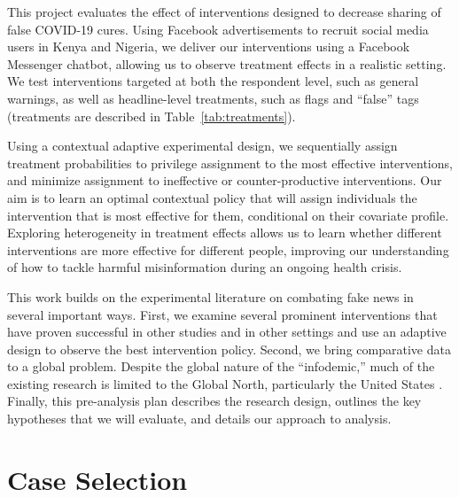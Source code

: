 \documentclass[letterpaper, 12pt, parskip=full,DIV=12]{scrartcl}
\begin{document}
This project evaluates the effect of interventions designed to decrease sharing of false COVID-19 cures. Using Facebook advertisements to recruit social media users in Kenya and Nigeria, we deliver our interventions using a Facebook Messenger chatbot, allowing us to observe treatment effects in a realistic setting. We test interventions targeted at both the respondent level, such as general warnings, as well as headline-level treatments, such as flags and ``false'' tags (treatments are described in Table~\ref{tab:treatments}). 

Using a contextual adaptive experimental design, we sequentially assign treatment probabilities to privilege assignment to the most effective interventions, and minimize assignment to ineffective or counter-productive interventions. Our aim is to learn an optimal contextual policy that will assign individuals the intervention that is most effective for them, conditional on their covariate profile. Exploring heterogeneity in treatment effects allows us to learn whether different interventions are more effective for different people, improving our understanding of how to tackle harmful misinformation during an ongoing health crisis. 

This work builds on the experimental literature on combating fake news in several important ways. First, we examine several prominent interventions that have proven successful in other studies and in other settings and use an adaptive design to observe the best intervention policy. Second, we bring comparative data to a global problem. Despite the global nature of the ``infodemic,'' much of the existing research is limited to the Global North, particularly the United States \citep{pennycook2020fighting, bursztyn2020misinformation}. Finally, this pre-analysis plan describes the research design, outlines the key hypotheses that we will evaluate, and details our approach to analysis.




\section{Case Selection}
\end{document}
